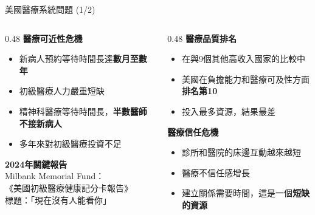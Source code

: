 \documentclass[aspectratio=169]{beamer}
\begin{document}
\begin{frame}{美國醫療系統問題 (1/2)}
\begin{columns}
\begin{column}{0.48\textwidth}
\textbf{\textcolor{medred}{醫療可近性危機}}
\begin{itemize}
\item 新病人預約等待時間長達\textbf{數月至數年}
\item 初級醫療人力嚴重短缺
\item 精神科醫療等待時間長，\textbf{半數醫師不接新病人}
\item 多年來對初級醫療投資不足
\end{itemize}

\vspace{0.3cm}
\textbf{\textcolor{medblue}{2024年關鍵報告}}\\
Milbank Memorial Fund：\\
《美國初級醫療健康記分卡報告》\\
標題：\textcolor{medred}{「現在沒有人能看你」}
\end{column}

\begin{column}{0.48\textwidth}
\textbf{\textcolor{medred}{醫療品質排名}}
\begin{itemize}
\item 在與9個其他高收入國家的比較中
\item 美國在負擔能力和醫療可及性方面\textbf{排名第10}
\item 投入最多資源，結果最差
\end{itemize}

\vspace{0.3cm}
\textbf{\textcolor{medred}{醫療信任危機}}
\begin{itemize}
\item 診所和醫院的床邊互動越來越短
\item 醫療不信任感增長
\item 建立關係需要時間，這是一個\textbf{短缺的資源}
\end{itemize}
\end{column}
\end{columns}
\end{frame}
\end{document}
